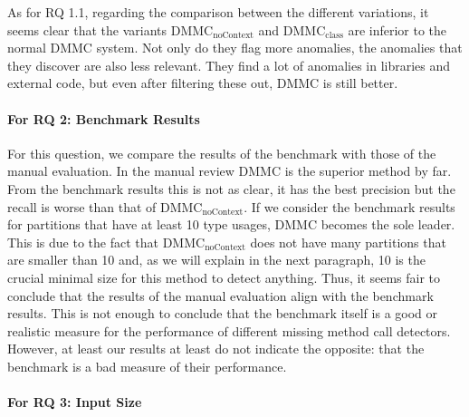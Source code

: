 As for RQ 1.1, regarding the comparison between the different variations, it seems clear that the variants $\text{DMMC}_\text{noContext}$ and $\text{DMMC}_\text{class}$ are inferior to the normal $\text{DMMC}$ system.
Not only do they flag more anomalies, the anomalies that they discover are also less relevant.
They find a lot of anomalies in libraries and external code, but even after filtering these out, $\text{DMMC}$ is still better.


\paragraph{For RQ 2: Benchmark Results}

For this question, we compare the results of the benchmark with those of the manual evaluation.
In the manual review $\text{DMMC}$ is the superior method by far.
From the benchmark results this is not as clear, it has the best precision but the recall is worse than that of $\text{DMMC}_\text{noContext}$.
If we consider the benchmark results for partitions that have at least 10 type usages, $\text{DMMC}$ becomes the sole leader.
This is due to the fact that $\text{DMMC}_\text{noContext}$ does not have many partitions that are smaller than 10 and, as we will explain in the next paragraph, 10 is the crucial minimal size for this method to detect anything.
Thus, it seems fair to conclude that the results of the manual evaluation align with the benchmark results.
This is not enough to conclude that the benchmark itself is a good or realistic measure for the performance of different missing method call detectors.
However, at least our results at least do not indicate the opposite: that the benchmark is a bad measure of their performance.

\paragraph{For RQ 3: Input Size}

